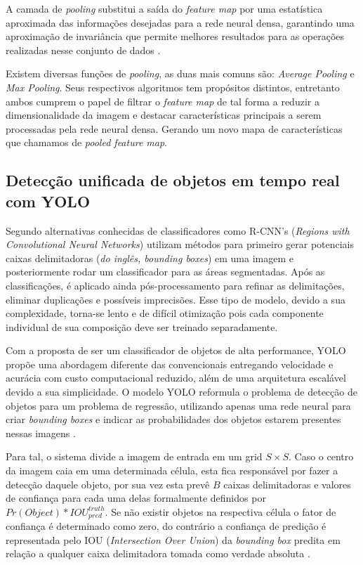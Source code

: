\documentclass[12pt]{article}
\begin{document}
A camada de {\it pooling} substitui a saída do {\it feature map} por uma estatística aproximada das informações desejadas para a rede neural densa, garantindo uma aproximação de invariância que permite melhores resultados para as operações realizadas nesse conjunto de dados \cite{Goodfellow-et-al-2016}.

Existem diversas funções de {\it pooling}, as duas mais comuns são: {\it Average Pooling} e {\it Max Pooling}. Seus respectivos algoritmos tem propósitos distintos, entretanto ambos cumprem o papel de filtrar o {\it feature map} de tal forma a reduzir a dimensionalidade da imagem e destacar características principais a serem processadas pela rede neural densa. Gerando um novo mapa de características que chamamos de {\it pooled feature map}.

\subsection{Detecção unificada de objetos em tempo real com YOLO}

Segundo  alternativas conhecidas de classificadores como R-CNN's ({\it Regions with Convolutional Neural Networks}) utilizam métodos para primeiro gerar potenciais caixas delimitadoras ({\it do inglês, bounding boxes}) em uma imagem e posteriormente rodar um classificador para as áreas segmentadas. Após as classificações, é aplicado ainda pós-processamento para refinar as delimitações, eliminar duplicações e possíveis imprecisões. Esse tipo de modelo, devido a sua complexidade, torna-se lento e de difícil otimização pois cada componente individual de sua composição deve ser treinado separadamente.

Com a proposta de ser um classificador de objetos de alta performance, YOLO propõe uma abordagem diferente das convencionais entregando velocidade e acurácia com custo computacional reduzido, além de uma arquitetura escalável devido a sua simplicidade. O modelo YOLO reformula o problema de detecção de objetos para um problema de regressão, utilizando apenas uma rede neural para criar {\it bounding boxes} e indicar as probabilidades dos objetos estarem presentes nessas imagens \cite{Redmon2015}.

Para tal, o sistema divide a imagem de entrada em um grid $S \times S$. Caso o centro da imagem caia em uma determinada célula, esta fica responsável por fazer a detecção daquele objeto, por sua vez esta prevê $B$ caixas delimitadoras e valores de confiança para cada uma delas formalmente definidos por $Pr(Object) * IOU^{truth}_{pred}$. Se não existir objetos na respectiva célula o fator de confiança é determinado como zero, do contrário a confiança de predição é representada pelo IOU ({\it Intersection Over Union}) da {\it bounding box} predita em relação a qualquer caixa delimitadora tomada como verdade absoluta \cite{Redmon2015}.
\end{document}
